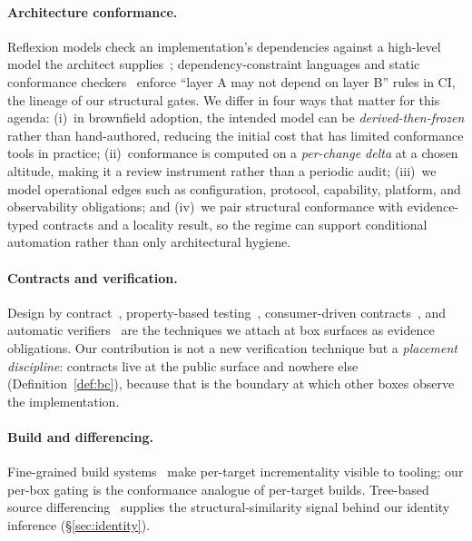 \documentclass[sigconf,review,anonymous]{acmart}
\theoremstyle{plain}
\theoremstyle{definition}
\begin{document}
\paragraph{Architecture conformance.}
Reflexion models check an implementation's dependencies against a high-level
model the architect supplies~\cite{murphy2001software}; dependency-constraint
languages and static conformance checkers~\cite{terra2009dependency,
passos2010static} enforce ``layer A may not depend on layer B'' rules in CI,
the lineage of our structural gates. We differ in four ways that matter for
this agenda: (i)~in brownfield adoption, the intended model can be
\emph{derived-then-frozen} rather than hand-authored, reducing the initial cost
that has limited conformance tools in practice; (ii)~conformance is computed on
a \emph{per-change delta} at a chosen altitude, making it a review instrument
rather than a periodic audit; (iii)~we model operational edges such as
configuration, protocol, capability, platform, and observability obligations;
and (iv)~we pair structural conformance with evidence-typed contracts and a
locality result, so the regime can support conditional automation rather than
only architectural hygiene.

\paragraph{Contracts and verification.}
Design by contract~\cite{beck2003contract}, property-based
testing~\cite{claessen2000quickcheck}, consumer-driven
contracts~\cite{fowler2006cdc}, and automatic verifiers~\cite{leino2010dafny}
are the techniques we attach at box surfaces as evidence obligations. Our
contribution is not a new verification technique but a \emph{placement
discipline}: contracts live at the public surface and nowhere else
(Definition~\ref{def:bc}), because that is the boundary at which other boxes
observe the implementation.

\paragraph{Build and differencing.}
Fine-grained build systems~\cite{bazel} make per-target incrementality visible
to tooling; our per-box gating is the conformance analogue of per-target
builds. Tree-based source differencing~\cite{falleri2014finegrained} supplies
the structural-similarity signal behind our identity inference
(\S\ref{sec:identity}).
\end{document}
